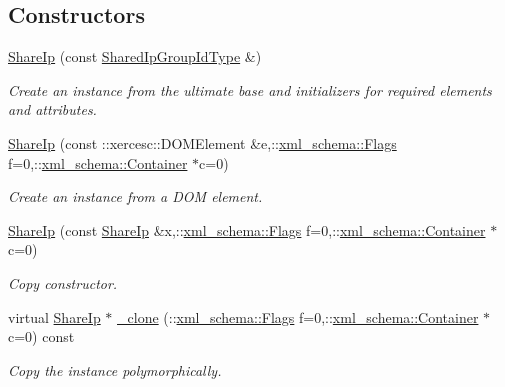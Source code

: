\subsection*{Constructors}
\begin{DoxyCompactItemize}
\item 
\hypertarget{classopenstack_1_1xml_1_1ShareIp_a6d62ef1f126ad046e8f0dcbcc28adda3}{
\hyperlink{classopenstack_1_1xml_1_1ShareIp_a6d62ef1f126ad046e8f0dcbcc28adda3}{ShareIp} (const \hyperlink{classopenstack_1_1xml_1_1ShareIp_a87dc25c5a0ba0a3cc1de61d027d9443d}{SharedIpGroupIdType} \&)}
\label{classopenstack_1_1xml_1_1ShareIp_a6d62ef1f126ad046e8f0dcbcc28adda3}

\begin{DoxyCompactList}\small\item\em Create an instance from the ultimate base and initializers for required elements and attributes. \item\end{DoxyCompactList}\item 
\hyperlink{classopenstack_1_1xml_1_1ShareIp_acb100b093f63a7d3ad5f9f679b44e3c2}{ShareIp} (const ::xercesc::DOMElement \&e,::\hyperlink{namespacexml__schema_affb4c227cbd9aa7453dd1dc5a1401943}{xml\_\-schema::Flags} f=0,::\hyperlink{namespacexml__schema_a333dea2213742aea47a37532dec4ec27}{xml\_\-schema::Container} $\ast$c=0)
\begin{DoxyCompactList}\small\item\em Create an instance from a DOM element. \item\end{DoxyCompactList}\item 
\hyperlink{classopenstack_1_1xml_1_1ShareIp_a500ce01f3e39a8f8eecd5fe20b8b8b87}{ShareIp} (const \hyperlink{classopenstack_1_1xml_1_1ShareIp}{ShareIp} \&x,::\hyperlink{namespacexml__schema_affb4c227cbd9aa7453dd1dc5a1401943}{xml\_\-schema::Flags} f=0,::\hyperlink{namespacexml__schema_a333dea2213742aea47a37532dec4ec27}{xml\_\-schema::Container} $\ast$c=0)
\begin{DoxyCompactList}\small\item\em Copy constructor. \item\end{DoxyCompactList}\item 
virtual \hyperlink{classopenstack_1_1xml_1_1ShareIp}{ShareIp} $\ast$ \hyperlink{classopenstack_1_1xml_1_1ShareIp_a655551f07077f3835aacf96ae371e7be}{\_\-clone} (::\hyperlink{namespacexml__schema_affb4c227cbd9aa7453dd1dc5a1401943}{xml\_\-schema::Flags} f=0,::\hyperlink{namespacexml__schema_a333dea2213742aea47a37532dec4ec27}{xml\_\-schema::Container} $\ast$c=0) const 
\begin{DoxyCompactList}\small\item\em Copy the instance polymorphically. \item\end{DoxyCompactList}\end{DoxyCompactItemize}


